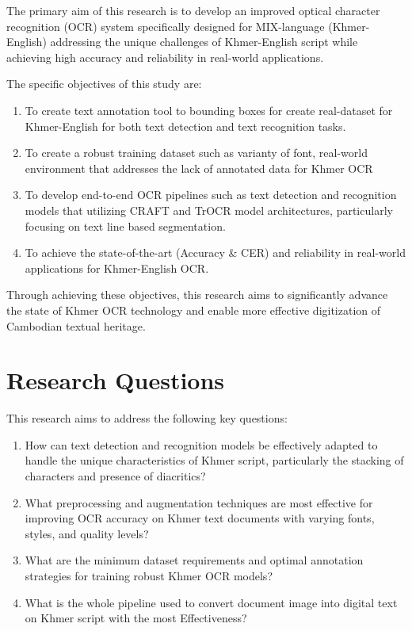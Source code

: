 The primary aim of this research is to develop an improved optical character recognition (OCR) system specifically designed for MIX-language (Khmer-English) addressing the unique challenges of Khmer-English script while achieving high accuracy and reliability in real-world applications.

The specific objectives of this study are:

\begin{enumerate}
    \item To create text annotation tool to bounding boxes for create real-dataset for Khmer-English for both text detection and text recognition tasks.
    \item To create a robust training dataset such as varianty of font, real-world environment that addresses the lack of annotated data for Khmer OCR
    \item To develop end-to-end OCR pipelines such as text detection and recognition models that utilizing CRAFT and TrOCR model architectures, particularly focusing on text line based segmentation.
    \item To achieve the state-of-the-art (Accuracy \& CER) and reliability in real-world applications for Khmer-English OCR.
\end{enumerate}

Through achieving these objectives, this research aims to significantly advance the state of Khmer OCR technology and enable more effective digitization of Cambodian textual heritage.

\section{Research Questions}
\label{sec:questions}

This research aims to address the following key questions:

\begin{enumerate}
    \item How can text detection and recognition models be effectively adapted to handle the unique characteristics of Khmer script, particularly the stacking of characters and presence of diacritics?
    
    \item What preprocessing and augmentation techniques are most effective for improving OCR accuracy on Khmer text documents with varying fonts, styles, and quality levels?

    \item What are the minimum dataset requirements and optimal annotation strategies for training robust Khmer OCR models?
    
    \item What is the whole pipeline used to convert document image into digital text on Khmer script with the most Effectiveness?
\end{enumerate}

